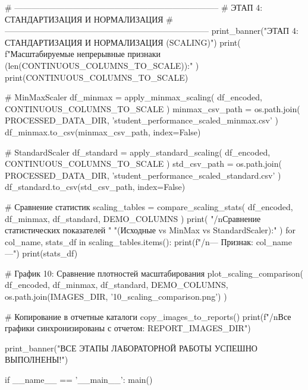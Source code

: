 \documentclass[14pt,a4paper]{extarticle}
\begin{document}
\begin{CodeListing}
    # --------------------------------------------------------------------------
    # ЭТАП 4: СТАНДАРТИЗАЦИЯ И НОРМАЛИЗАЦИЯ
    # --------------------------------------------------------------------------
    print_banner("ЭТАП 4: СТАНДАРТИЗАЦИЯ И НОРМАЛИЗАЦИЯ (SCALING)")
    print(
        f"Масштабируемые непрерывные признаки ({len(CONTINUOUS_COLUMNS_TO_SCALE)}):"
    )
    print(CONTINUOUS_COLUMNS_TO_SCALE)

    # MinMaxScaler
    df_minmax = apply_minmax_scaling(
        df_encoded, CONTINUOUS_COLUMNS_TO_SCALE
    )
    minmax_csv_path = os.path.join(
        PROCESSED_DATA_DIR, 'student_performance_scaled_minmax.csv'
    )
    df_minmax.to_csv(minmax_csv_path, index=False)

    # StandardScaler
    df_standard = apply_standard_scaling(
        df_encoded, CONTINUOUS_COLUMNS_TO_SCALE
    )
    std_csv_path = os.path.join(
        PROCESSED_DATA_DIR, 'student_performance_scaled_standard.csv'
    )
    df_standard.to_csv(std_csv_path, index=False)

    # Сравнение статистик
    scaling_tables = compare_scaling_stats(
        df_encoded, df_minmax, df_standard, DEMO_COLUMNS
    )
    print(
        "/nСравнение статистических показателей "
        "(Исходные vs MinMax vs StandardScaler):"
    )
    for col_name, stats_df in scaling_tables.items():
        print(f"/n--- Признак: {col_name} ---")
        print(stats_df)

    # График 10: Сравнение плотностей масштабирования
    plot_scaling_comparison(
        df_encoded, df_minmax, df_standard, DEMO_COLUMNS,
        os.path.join(IMAGES_DIR, '10_scaling_comparison.png')
    )

    # Копирование в отчетные каталоги
    copy_images_to_reports()
    print(f"/nВсе графики синхронизированы с отчетом: {REPORT_IMAGES_DIR}")

    print_banner("ВСЕ ЭТАПЫ ЛАБОРАТОРНОЙ РАБОТЫ УСПЕШНО ВЫПОЛНЕНЫ!")


if __name__ == '__main__':
    main()\end{CodeListing}

\clearpage
\end{document}
